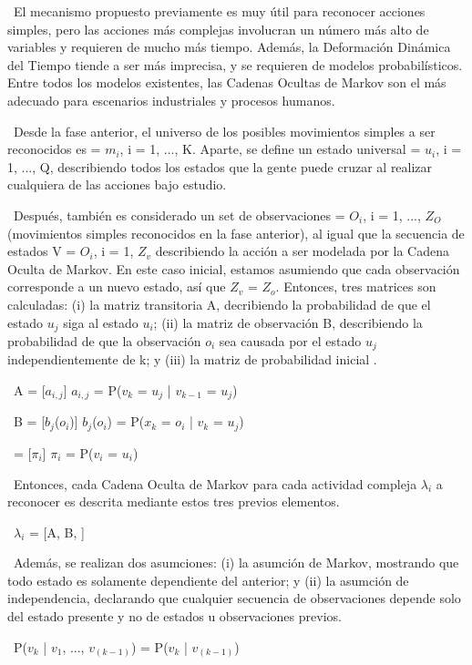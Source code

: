 \ El mecanismo propuesto previamente es muy útil para reconocer acciones simples, pero las acciones más complejas involucran un número más alto de variables y requieren de mucho más tiempo. Además, la Deformación Dinámica del Tiempo tiende a ser más imprecisa, y se requieren de modelos probabilísticos. Entre todos los modelos existentes, las Cadenas Ocultas de Markov son el más adecuado para escenarios industriales y procesos humanos.

\ Desde la fase anterior, el universo de los posibles movimientos simples a ser reconocidos es  = {$m_i$, i = 1, ..., K}. Aparte, se define un estado universal  = {$u_i$, i = 1, ..., Q}, describiendo todos los estados que la gente puede cruzar al realizar cualquiera de las acciones bajo estudio.

\ Después, también es considerado un set de observaciones  = {$O_i$, i = 1, ..., $Z_O$} (movimientos simples reconocidos en la fase anterior), al igual que la secuencia de estados V = {$O_i$, i = 1, $Z_v$} describiendo la acción a ser modelada por la Cadena Oculta de Markov. En este caso inicial, estamos asumiendo que cada observación corresponde a un nuevo estado, así que $Z_v$ = $Z_o$. Entonces, tres matrices son calculadas: (i) la matriz transitoria A, decribiendo la probabilidad de que el estado $u_j$ siga al estado $u_i$; (ii) la matriz de observación B, describiendo la probabilidad de que la observación $o_i$ sea causada por el estado $u_j$ independientemente de k; y (iii) la matriz de probabilidad inicial \prod.

\ A = [$a_{i,j}$]   $a_{i,j}$ = P($v_k$ = $u_j$ | $v_{k-1}$ = $u_j$)

\ B = [$b_j$($o_i$)]  $b_j$($o_i$) = P($x_k$ = $o_i$ | $v_k$ = $u_j$)

\ \prod = [$\pi_i$]   $\pi_i$ = P($v_i$ = $u_i$)

\ Entonces, cada Cadena Oculta de Markov para cada actividad compleja $\lambda_i$ a reconocer es descrita mediante estos tres previos elementos.

\ $\lambda_i$ = [A, B, \prod]

\ Además, se realizan dos asumciones: (i) la asumción de Markov, mostrando que todo estado es solamente dependiente del anterior; y (ii) la asumción de independencia, declarando que cualquier secuencia de observaciones depende solo del estado presente y no de estados u observaciones previos.

\ P($v_k$ | $v_1$, ..., $v_(k-1)$) = P($v_k$ | $v_(k-1)$)

